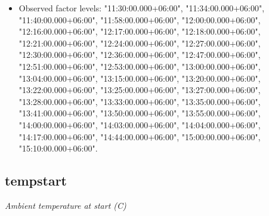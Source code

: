 \documentclass[]{article}
\providecommand{\tightlist}{%
  \setlength{\itemsep}{0pt}\setlength{\parskip}{0pt}}
\begin{document}
\begin{itemize}
\tightlist
\item
  Observed factor levels: "11:30:00.000+06:00", "11:34:00.000+06:00",
  "11:40:00.000+06:00", "11:58:00.000+06:00", "12:00:00.000+06:00",
  "12:16:00.000+06:00", "12:17:00.000+06:00", "12:18:00.000+06:00",
  "12:21:00.000+06:00", "12:24:00.000+06:00", "12:27:00.000+06:00",
  "12:30:00.000+06:00", "12:36:00.000+06:00", "12:47:00.000+06:00",
  "12:51:00.000+06:00", "12:53:00.000+06:00", "13:00:00.000+06:00",
  "13:04:00.000+06:00", "13:15:00.000+06:00", "13:20:00.000+06:00",
  "13:22:00.000+06:00", "13:25:00.000+06:00", "13:27:00.000+06:00",
  "13:28:00.000+06:00", "13:33:00.000+06:00", "13:35:00.000+06:00",
  "13:41:00.000+06:00", "13:50:00.000+06:00", "13:55:00.000+06:00",
  "14:00:00.000+06:00", "14:03:00.000+06:00", "14:04:00.000+06:00",
  "14:17:00.000+06:00", "14:44:00.000+06:00", "15:00:00.000+06:00",
  "15:10:00.000+06:00".
\end{itemize}

\noindent\makebox[\linewidth]{\rule{\textwidth}{0.4pt}}

\hypertarget{tempstart}{%
\subsection{tempstart}\label{tempstart}}

\emph{Ambient temperature at start (C)}
\end{document}
